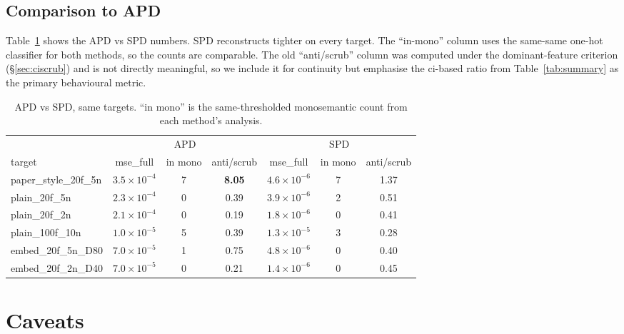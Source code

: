 \documentclass[11pt]{article}
\begin{document}
\subsection{Comparison to APD}

Table~\ref{tab:comparison} shows the APD vs SPD numbers. SPD
reconstructs tighter on every target. The ``in-mono'' column uses the
same-same one-hot classifier for both methods, so the counts are
comparable. The old ``anti/scrub'' column was computed under the
dominant-feature criterion (§\ref{sec:ciscrub}) and is not directly
meaningful, so we include it for continuity but emphasise the
ci-based ratio from Table~\ref{tab:summary} as the primary
behavioural metric.

\begin{table}[h]
\centering
\caption{APD vs SPD, same targets. ``in mono'' is the same-thresholded
monosemantic count from each method's analysis.}
\label{tab:comparison}
\small
\begin{tabular}{lcccccc}
\toprule
 & \multicolumn{3}{c}{APD} & \multicolumn{3}{c}{SPD} \\
\cmidrule(r){2-4}\cmidrule(l){5-7}
target & mse\_full & in mono & anti/scrub & mse\_full & in mono & anti/scrub \\
\midrule
paper\_style\_20f\_5n & $3.5\times 10^{-4}$ & 7 & \textbf{8.05} & $4.6\times 10^{-6}$ & 7 & 1.37 \\
plain\_20f\_5n        & $2.3\times 10^{-4}$ & 0 & 0.39         & $3.9\times 10^{-6}$ & 2 & 0.51 \\
plain\_20f\_2n        & $2.1\times 10^{-4}$ & 0 & 0.19         & $1.8\times 10^{-6}$ & 0 & 0.41 \\
plain\_100f\_10n      & $1.0\times 10^{-5}$ & 5 & 0.39         & $1.3\times 10^{-5}$ & 3 & 0.28 \\
embed\_20f\_5n\_D80   & $7.0\times 10^{-5}$ & 1 & 0.75         & $4.8\times 10^{-6}$ & 0 & 0.40 \\
embed\_20f\_2n\_D40   & $7.0\times 10^{-5}$ & 0 & 0.21         & $1.4\times 10^{-6}$ & 0 & 0.45 \\
\bottomrule
\end{tabular}
\end{table}

\section{Caveats}
\label{sec:caveats}
\end{document}
